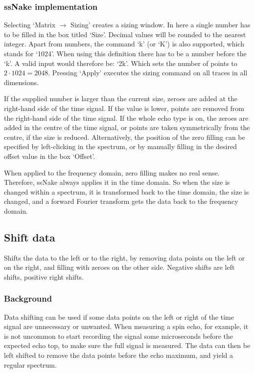 \documentclass[11pt,a4paper]{article}
\begin{document}
\subsubsection*{ssNake implementation}
Selecting `Matrix $\rightarrow$ Sizing' creates a sizing window. In here a single number has to be filled in the box titled `Size'. Decimal values will be rounded to the nearest integer. Apart from numbers, the command `k' (or `K') is also supported, which stands for `1024'. When using this definition there has to be a number before the `k'. A valid input would therefore be: `2k'. Which sets the number of points to $2 \cdot 1024=2048$. Pressing `Apply' executes the sizing command on all traces in all dimensions.

If the supplied number is larger than the current size, zeroes are added at the right-hand side of the time signal. If the value is lower, points are removed from the right-hand side of the time signal. If the whole echo type is on, the zeroes are added in the centre of the time signal, or points are taken symmetrically from the centre, if the size is reduced. Alternatively, the position of the zero filling can be specified by left-clicking in the spectrum, or by manually filling in the desired offset value in the box `Offset'.

When applied to the frequency domain, zero filling makes no real sense. Therefore, ssNake always applies it in the time domain. So when the size is changed within a spectrum, it is transformed back to the time domain, the size is changed, and a forward Fourier transform gets the data back to the frequency domain.

\subsection{Shift data}
Shifts the data to the left or to the right, by removing data points on the left or on the right, and filling with zeroes on the other side. Negative shifts are left shifts, positive right shifts.

\subsubsection*{Background}
Data shifting can be used if some data points on the left or right of the time signal are unnecessary or unwanted. When measuring a spin echo, for example, it is not uncommon to start recording the signal some microseconds before the expected echo top, to make sure the full signal is measured. The data can then be left shifted to remove the data points before the echo maximum, and yield a regular spectrum.
\end{document}
